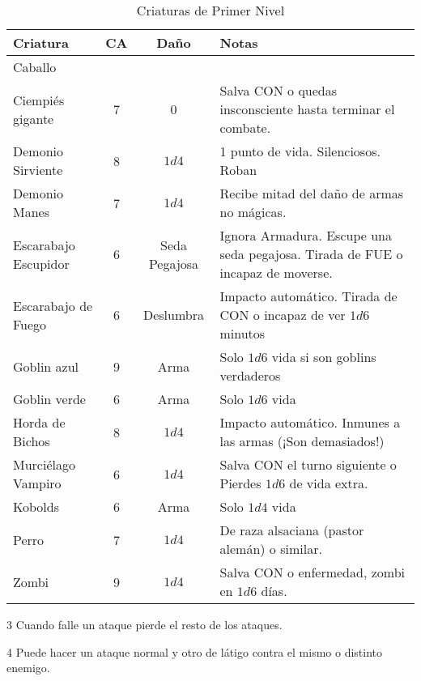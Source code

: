 \begin{table*}[p]
\caption{Criaturas de Primer Nivel}
\label{c:animales}
\centering
\begin{threeparttable}
\begin{tabular}{lccp{8cm}}
\toprule
Criatura             & CA & Daño & Notas\\
\midrule
Caballo              \\
Ciempiés gigante     & 7 & 0 & Salva CON o quedas insconsciente hasta terminar el combate. \\
Demonio Sirviente    & 8 & $1d4$ & 1 punto de vida. Silenciosos. Roban \\
Demonio Manes        & 7 & $ 1d4$ & Recibe mitad del daño de armas no mágicas. \\
Escarabajo Escupidor & 6 & Seda Pegajosa & Ignora Armadura. Escupe una seda pegajosa. Tirada de FUE o incapaz de moverse. \\
Escarabajo de Fuego  & 6 & Deslumbra &  Impacto automático. Tirada de CON o incapaz de ver $ 1d6$ minutos\\
Goblin azul          & 9 & Arma & Solo $ 1d6$ vida si son goblins verdaderos\\
Goblin verde         & 6 & Arma & Solo $ 1d6$ vida\\
Horda de Bichos      & 8 & $1d4$ & Impacto automático. Inmunes a las armas (¡Son demasiados!)\\
Murciélago Vampiro   & 6 & $1d4$ & Salva CON el turno siguiente o Pierdes $1d6$ de vida extra.\\
Kobolds              & 6 & Arma & Solo $1d4$ vida\\
Perro                & 7 & $1d4$ & De raza alsaciana (pastor alemán) o similar.\\
Zombi                & 9 & $ 1d4$ & Salva CON o enfermedad, zombi en $ 1d6$ días.\\
\bottomrule
\bottomrule
\end{tabular}
\begin{tablenotes}
\item 3 Cuando falle un ataque pierde el resto de los ataques.
\item 4 Puede hacer un ataque normal y otro de látigo contra el mismo o distinto enemigo.
\end{tablenotes}
\end{threeparttable}
\end{table*}

